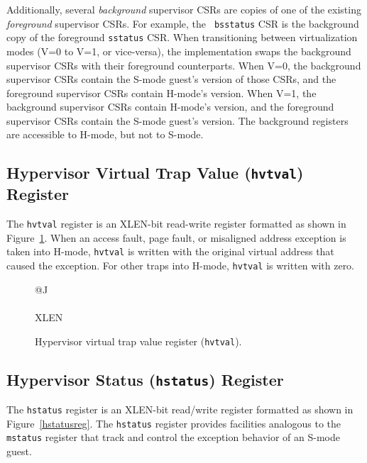 Additionally, several {\em background} supervisor CSRs are copies of one of
the existing {\em foreground} supervisor CSRs.  For example, the {\tt
bsstatus} CSR is the background copy of the foreground {\tt sstatus} CSR.
When transitioning between virtualization modes (V=0 to V=1, or vice-versa),
the implementation swaps the background supervisor CSRs with their foreground
counterparts.  When V=0, the background supervisor CSRs contain the S-mode
guest's version of those CSRs, and the foreground supervisor CSRs contain
H-mode's version.  When V=1, the background supervisor CSRs contain H-mode's
version, and the foreground supervisor CSRs contain the S-mode guest's
version.  The background registers are accessible to H-mode, but not to S-mode.

\subsection{Hypervisor Virtual Trap Value ({\tt hvtval}) Register}

The {\tt hvtval} register is an XLEN-bit read-write register formatted as shown
in Figure~\ref{hvtvalreg}.  When an access fault, page fault, or misaligned
address exception is taken into H-mode, {\tt hvtval} is
written with the original virtual address that caused the exception.
For other traps into H-mode, {\tt hvtval} is written with zero.

\begin{figure}[h!]
{\footnotesize
\begin{center}
\begin{tabular}{@{}J}
 \\
\hline
{} \\
\hline
XLEN \\
\end{tabular}
\end{center}
}
\vspace{-0.1in}
\caption{Hypervisor virtual trap value register ({\tt hvtval}).}
\label{hvtvalreg}
\end{figure}

\subsection{Hypervisor Status ({\tt hstatus}) Register}

The {\tt hstatus} register is an XLEN-bit read/write register
formatted as shown in Figure~\ref{hstatusreg}.  The {\tt hstatus}
register provides facilities analogous to the {\tt mstatus} register
that track and control the exception behavior of an S-mode guest.

